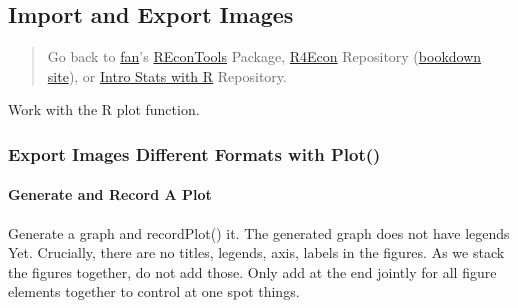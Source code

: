 \documentclass[
]{book}
\begin{document}
\hypertarget{import-and-export-images}{%
\subsection{Import and Export Images}\label{import-and-export-images}}

\begin{quote}
Go back to \href{http://fanwangecon.github.io/}{fan}'s \href{https://fanwangecon.github.io/REconTools/}{REconTools} Package, \href{https://fanwangecon.github.io/R4Econ/}{R4Econ} Repository (\href{https://fanwangecon.github.io/R4Econ/bookdown}{bookdown site}), or \href{https://fanwangecon.github.io/Stat4Econ/}{Intro Stats with R} Repository.
\end{quote}

Work with the R plot function.

\hypertarget{export-images-different-formats-with-plot}{%
\subsubsection{Export Images Different Formats with Plot()}\label{export-images-different-formats-with-plot}}

\hypertarget{generate-and-record-a-plot}{%
\paragraph{Generate and Record A Plot}\label{generate-and-record-a-plot}}

Generate a graph and recordPlot() it. The generated graph does not have legends Yet. Crucially, there are no titles, legends, axis, labels in the figures. As we stack the figures together, do not add those. Only add at the end jointly for all figure elements together to control at one spot things.
\end{document}
